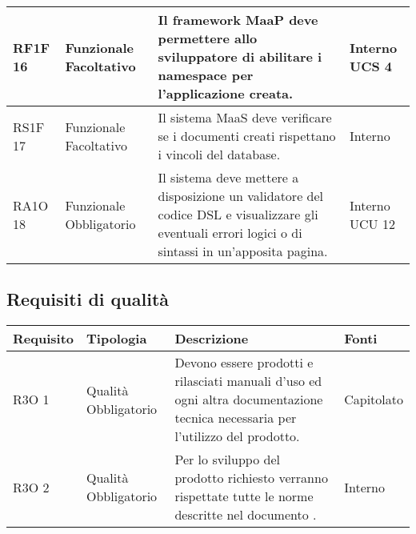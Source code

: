 \begin{center}
\begin{longtable}{ | l | p{2cm} | p{5cm} | p{1.7cm} |}
        RF1F 16 & Funzionale \newline  Facoltativo  & Il framework MaaP deve permettere allo sviluppatore di abilitare i namespace per l’applicazione creata. &  Interno \newline  UCS 4 \newline  \\ \hline      
        RS1F 17 & Funzionale \newline  Facoltativo  & Il sistema MaaS deve verificare se i documenti creati rispettano i vincoli del database. &  Interno \newline  \\ \hline      
        RA1O 18 & Funzionale \newline  Obbligatorio  & Il sistema deve mettere a disposizione un validatore del codice DSL e visualizzare gli eventuali errori logici o di sintassi in un'apposita pagina. &  Interno \newline  UCU 12 \newline  \\ \hline
      \end{longtable}
      \egroup
      \end{center}  
\clearpage

\subsection{Requisiti di qualità }

      \begin{center}
      \bgroup
      \def\arraystretch{1.8}
      \begin{longtable}{ | l | p{2cm} | p{5cm} | p{1.7cm} |}
    
      \cellcolor[gray]{0.9} \textbf{Requisito} & \cellcolor[gray]{0.9} \textbf{Tipologia} 
      & \cellcolor[gray]{0.9} \textbf{Descrizione} & \cellcolor[gray]{0.9} \textbf{Fonti} \\ \hline
      
        R3O 1 & Qualità \newline  Obbligatorio  & Devono essere prodotti e rilasciati manuali d'uso ed ogni altra documentazione tecnica necessaria per l’utilizzo del prodotto. &  Capitolato \newline  \\ \hline      
        R3O 2 & Qualità \newline  Obbligatorio  & Per lo sviluppo del prodotto richiesto verranno rispettate tutte le norme descritte nel documento \NormeDiProgetto{}. &  Interno \newline  \\ \hline
      \end{longtable}
      \egroup
      \end{center}  
\clearpage

